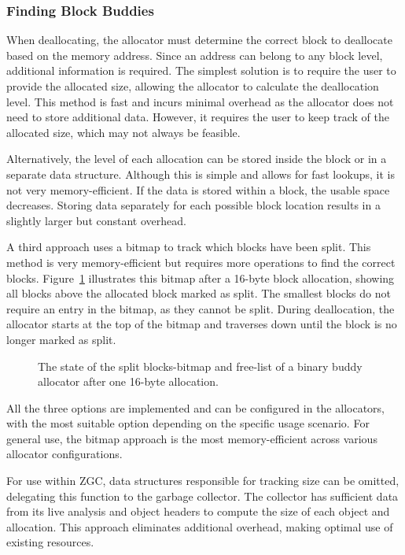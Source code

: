 \subsubsection{Finding Block Buddies} \label{sec:findbuddiesexpl}
When deallocating, the allocator must determine the correct block to deallocate based on the memory address. Since an address can belong to any block level, additional information is required. The simplest solution is to require the user to provide the allocated size, allowing the allocator to calculate the deallocation level. This method is fast and incurs minimal overhead as the allocator does not need to store additional data. However, it requires the user to keep track of the allocated size, which may not always be feasible.

Alternatively, the level of each allocation can be stored inside the block or in a separate data structure. Although this is simple and allows for fast lookups, it is not very memory-efficient. If the data is stored within a block, the usable space decreases. Storing data separately for each possible block location results in a slightly larger but constant overhead.

A third approach uses a bitmap to track which blocks have been split. This method is very memory-efficient but requires more operations to find the correct blocks. Figure~\ref{fig:buddybmapsplit} illustrates this bitmap after a 16-byte block allocation, showing all blocks above the allocated block marked as split. The smallest blocks do not require an entry in the bitmap, as they cannot be split. During deallocation, the allocator starts at the top of the bitmap and traverses down until the block is no longer marked as split.

\begin{figure}[h]
    \centering
    
    \caption{The state of the split blocks-bitmap and free-list of a binary buddy allocator after one 16-byte allocation.}
    \label{fig:buddybmapsplit}
\end{figure}

All the three options are implemented and can be configured in the allocators, with the most suitable option depending on the specific usage scenario. For general use, the bitmap approach is the most memory-efficient across various allocator configurations.

For use within ZGC, data structures responsible for tracking size can be omitted, delegating this function to the garbage collector. The collector has sufficient data from its live analysis and object headers to compute the size of each object and allocation. This approach eliminates additional overhead, making optimal use of existing resources.

